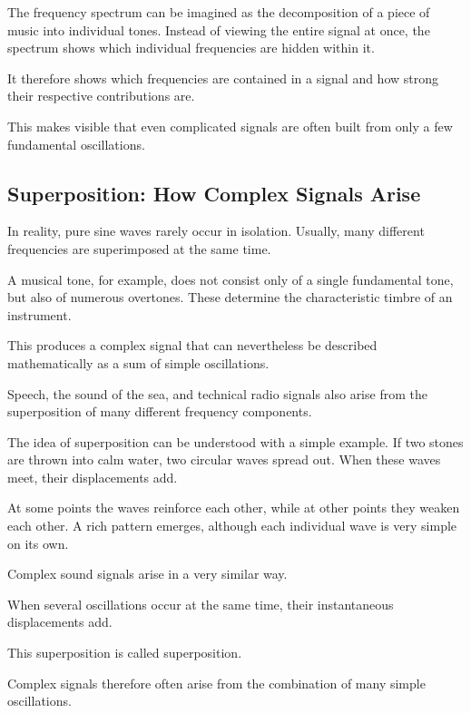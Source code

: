 The frequency spectrum can be imagined
as the decomposition of a piece of music into individual tones.
Instead of viewing the entire signal at once,
the spectrum shows
which individual frequencies are hidden within it.

It therefore shows
which frequencies are contained in a signal
and how strong their respective contributions are.

This makes visible
that even complicated signals are often built from only a few fundamental oscillations.

\subsection{Superposition: How Complex Signals Arise}

In reality, pure sine waves rarely occur in isolation.
Usually, many different frequencies are superimposed at the same time.

A musical tone, for example, does not consist only of a single fundamental tone,
but also of numerous overtones.
These determine the characteristic timbre of an instrument.

This produces a complex signal
that can nevertheless be described mathematically as a sum of simple oscillations.

Speech,
the sound of the sea,
and technical radio signals also arise
from the superposition of many different frequency components.

\medskip

The idea of superposition can be understood with a simple example.
If two stones are thrown into calm water,
two circular waves spread out.
When these waves meet,
their displacements add.

At some points the waves reinforce each other,
while at other points they weaken each other.
A rich pattern emerges,
although each individual wave is very simple on its own.

Complex sound signals arise in a very similar way.

\begin{DidacticBox}
	\small
	\label{box:fourier-ueberlagerung-wellen}
	When several oscillations occur at the same time,
	their instantaneous displacements add.
	
	This superposition is called superposition.
	
	Complex signals therefore often arise
	from the combination of many simple oscillations.
\end{DidacticBox}

